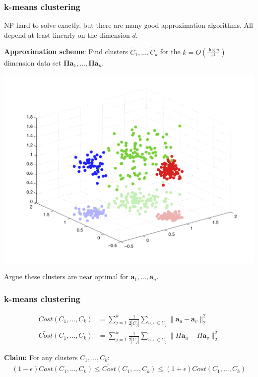 \documentclass[compress]{beamer}
\newcommand{\bs}[1]{\boldsymbol{#1}}
\newcommand{\bv}[1]{\mathbf{#1}}
\begin{document}
\begin{frame}[t]
	\frametitle{k-means clustering}
	NP hard to solve exactly, but there are many good approximation algorithms. All depend at least linearly on the dimension $d$. 
	
	\textbf{Approximation scheme}: Find clusters $\tilde{C}_1, \ldots, \tilde{C}_k$ for the $k = O\left(\frac{\log n}{\epsilon^2}\right)$ dimension data set $\bs{\Pi}\bv{a}_1, \ldots, \bs{\Pi}\bv{a}_n.$
	
	\vspace{-3em}
	\begin{center}
		\includegraphics[width=.6\textwidth]{clustering_projected.png}
	\end{center}
	\vspace{-2em}
	Argue these clusters are near optimal for $\bv{a}_1, \ldots, \bv{a}_n$.
\end{frame}




\begin{frame}[t]
	\frametitle{k-means clustering}
	\begin{align*}
		Cost(C_1,\ldots, C_k) &= \sum_{j=1}^k \frac{1}{2|C_j|}\sum_{u,v\in C_j} \|\bv{a}_u - \bv{a}_v\|_2^2 \\
		\widetilde{Cost}(C_1,\ldots, C_k) &= \sum_{j=1}^k \frac{1}{2|C_j|}\sum_{u,v\in C_j} \|\Pi\bv{a}_u - \Pi\bv{a}_v\|_2^2
	\end{align*}
		
		
		\textbf{Claim:} For any clusters $C_1, \ldots, C_k$:
		\begin{align*}
	(1-\epsilon) Cost(C_1, \ldots, C_k) \leq \widetilde{Cost}(C_1, \ldots, C_k)   \leq  (1+\epsilon) Cost(C_1, \ldots, C_k) 
		\end{align*}
	
\end{frame}
\end{document}
